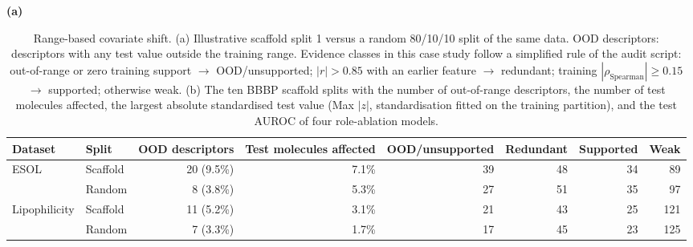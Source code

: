 \documentclass[10pt,a4paper]{article}
\renewcommand{\thetable}{S\arabic{table}}
\begin{document}
\begin{table}[H]
\renewcommand{\thetable}{S3}
\caption{Range-based covariate shift. (a) Illustrative scaffold split 1 versus a random 80/10/10 split of the same data. OOD descriptors: descriptors with any test value outside the training range. Evidence classes in this case study follow a simplified rule of the audit script: out-of-range or zero training support $\rightarrow$ OOD/unsupported; $|r|>0.85$ with an earlier feature $\rightarrow$ redundant; training $|\rho_{\mathrm{Spearman}}|\geq0.15$ $\rightarrow$ supported; otherwise weak. (b) The ten BBBP scaffold splits with the number of out-of-range descriptors, the number of test molecules affected, the largest absolute standardised test value (Max $|z|$, standardisation fitted on the training partition), and the test AUROC of four role-ablation models.}\label{tab:shift}
\centering\footnotesize
\textbf{(a)}\par\smallskip
\begin{tabular}{@{}llrrrrrr@{}}
\toprule
Dataset & Split & OOD descriptors & Test molecules affected & OOD/unsupported & Redundant & Supported & Weak \\
\midrule
ESOL & Scaffold & 20 (9.5\%) & 7.1\% & 39 & 48 & 34 & 89 \\
 & Random & 8 (3.8\%) & 5.3\% & 27 & 51 & 35 & 97 \\
Lipophilicity & Scaffold & 11 (5.2\%) & 3.1\% & 21 & 43 & 25 & 121 \\
 & Random & 7 (3.3\%) & 1.7\% & 17 & 45 & 23 & 125 \\
\bottomrule
\end{tabular}


\end{table}
\end{document}
